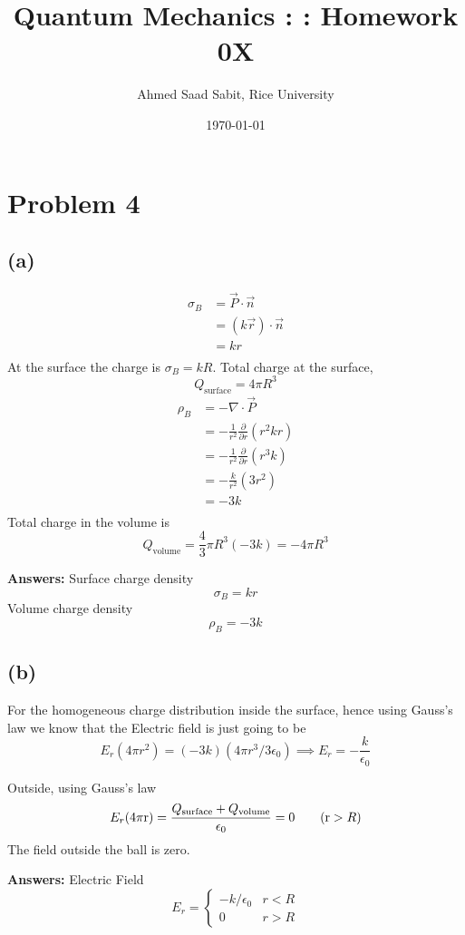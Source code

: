 \documentclass[letter, 10pts]{article}
\title{Quantum Mechanics : : Homework 0X}
\author{Ahmed Saad Sabit, Rice University}
\date{\today}
\begin{document}
\maketitle


\section*{Problem 4} 
\subsection*{(a)} 
\begin{align*}
\sigma_B &= \vec{P} \cdot \vec{n} 
\\
&= (k \vec{r}) \cdot  \vec{n}  \\
&= kr \\
\end{align*} 
At the surface the charge is $\sigma_B = k R$. Total charge at the surface, 
\[
Q_\text{surface} = 4 \pi R^3
\] 
\begin{align*}
\rho_B &= - \nabla \cdot  \vec{P} \\
&= -\frac{1}{r^2} \frac{\partial }{\partial r}(r^2 k r)  \\
&= -\frac{1}{r^2} \frac{\partial}{\partial r}(r^3 k)  \\
&= -\frac{k}{r^2} (3 r^2 )  \\
&= -3k \\
\end{align*}
Total charge in the volume is 
\[
Q_\text{volume} = \frac{4}{3} \pi R^3 (- 3 k) = - 4 \pi R^3 
\] 

\textbf{Answers:}
Surface charge density \[
\boxed{
\sigma_B = kr
}
\] 
Volume charge density 
\[
\boxed{
\rho_B = - 3k
}
\] 

\subsection*{(b)} 
For the homogeneous charge distribution inside the surface, hence using Gauss's law we know that the Electric field is just going to be 
\[
	E_r (4 \pi r^2) = (-3k) (4 \pi r^3 / 3\epsilon_0) 
	\implies 
	E_r = - \frac{k}{\epsilon_0}\tag{$r < R$}
\] 

Outside, using Gauss's law
\[
	E_r (4 \pi \mathrm{r}   ) = \frac{Q_\text{surface} + Q_\text{volume} }{\epsilon_0} = 0   
	\tag{$\mathrm{r} > R $}
\]  
The field outside the ball is zero. 

\textbf{Answers:} Electric Field \[
\boxed{E_r =
\begin{cases}
 - k / \epsilon_0 & r < R\\
	 0 & r > R 
\end{cases}} 
\] 
\end{document}
